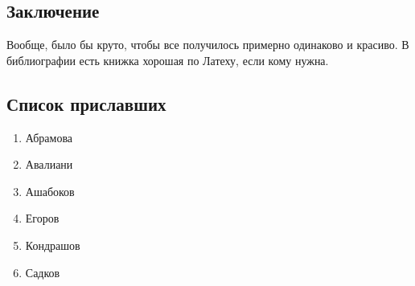 \subsection{Заключение}

Вообще, было бы круто, чтобы все получилось примерно одинаково и красиво. В библиографии есть книжка хорошая по Латеху, если кому нужна.

\subsection{Список приславших}

\begin{enumerate}
    \item Абрамова
    \item Авалиани
    \item Ашабоков
    \item Егоров
    \item Кондрашов
    \item Садков
\end{enumerate}
